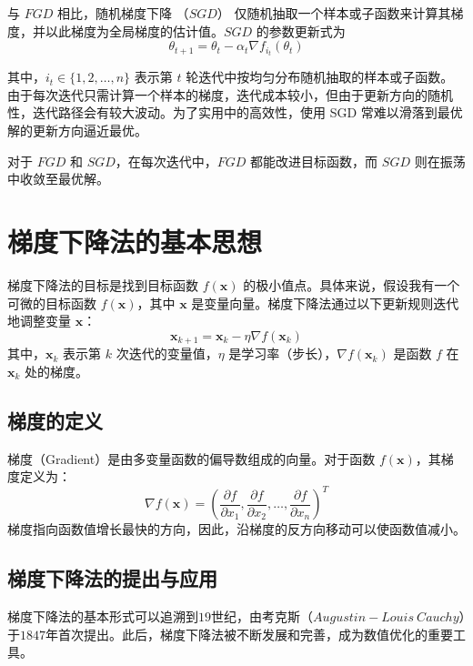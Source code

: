 \documentclass[printMode=false, declarePage=false]{ecnuthesis}
\begin{document}
    与 $FGD$ 相比，随机梯度下降 （$SGD$） 仅随机抽取一个样本或子函数来计算其梯度，并以此梯度为全局梯度的估计值。$SGD$ 的参数更新式为
    \begin{equation}
    \theta_{t+1} = \theta_t - \alpha_t \nabla f_{i_t}(\theta_t)
    \end{equation}

    其中，$i_t \in \{1, 2, \ldots, n\}$ 表示第 $t$ 轮迭代中按均匀分布随机抽取的样本或子函数。由于每次迭代只需计算一个样本的梯度，迭代成本较小，但由于更新方向的随机性，迭代路径会有较大波动。为了实用中的高效性，使用 SGD 常难以滑落到最优解的更新方向逼近最优。

    对于 $FGD$ 和 $SGD$，在每次迭代中，$FGD$ 都能改进目标函数，而 $SGD$ 则在振荡中收敛至最优解。\cite{史加荣2021随机梯度下降算法研究进展}


    \section{梯度下降法的基本思想}
    梯度下降法的目标是找到目标函数 \( f(\mathbf{x}) \) 的极小值点。具体来说，假设我有一个可微的目标函数 \( f(\mathbf{x}) \)，其中 \( \mathbf{x} \) 是变量向量。梯度下降法通过以下更新规则迭代地调整变量 \( \mathbf{x} \)：
    \begin{equation}
        \mathbf{x}_{k+1} = \mathbf{x}_k - \eta \nabla f(\mathbf{x}_k)
    \end{equation}
    其中，\( \mathbf{x}_k \) 表示第 \( k \) 次迭代的变量值，\( \eta \) 是学习率（步长），\( \nabla f(\mathbf{x}_k) \) 是函数 \( f \) 在 \( \mathbf{x}_k \) 处的梯度。

    \subsection{梯度的定义}
    梯度（Gradient）是由多变量函数的偏导数组成的向量。对于函数 \( f(\mathbf{x}) \)，其梯度定义为：
    \begin{equation}
        \nabla f(\mathbf{x}) = \left( \frac{\partial f}{\partial x_1}, \frac{\partial f}{\partial x_2}, \ldots, \frac{\partial f}{\partial x_n} \right)^T
    \end{equation}
    梯度指向函数值增长最快的方向，因此，沿梯度的反方向移动可以使函数值减小。

    \subsection{梯度下降法的提出与应用}
    梯度下降法的基本形式可以追溯到$19$世纪，由考克斯（$Augustin-Louis\ Cauchy$）于$1847$年首次提出。此后，梯度下降法被不断发展和完善，成为数值优化的重要工具。
\end{document}
